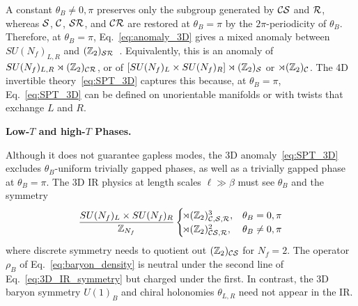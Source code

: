 \documentclass[
 reprint,







nofootinbib,


 amsmath,amssymb,
 aps,
 prd






tightenlines
]{revtex4-2}
\begin{document}
A constant $\theta_B\neq0,\pi$ preserves only the subgroup generated by
$\mathcal{C}\mathcal{S}$ and $\mathcal{R}$, whereas $\mathcal{S}$, $\mathcal{C}$, $\mathcal{S}\mathcal{R}$, and
$\mathcal{C}\mathcal{R}$ are restored at $\theta_B=\pi$ by the $2\pi$-periodicity
of $\theta_B$. Therefore, at $\theta_B=\pi$,
Eq.~\eqref{eq:anomaly_3D} gives a mixed anomaly between $SU(N_f)_{L,R}$
and $(\mathbb{Z}_2)_{\mathcal{S}\mathcal{R}}$~\cite{Yonekura:2019vyz,Nishimura:2019umw,Kobayashi:2023ajk}.
Equivalently, this is an anomaly of
$SU(N_f)_{L,R}\rtimes(\mathbb{Z}_2)_{\mathcal{C}\mathcal{R}}$, or of
$[SU(N_f)_L\times SU(N_f)_R]\rtimes(\mathbb{Z}_2)_{\mathcal{S}}$ or
$\rtimes(\mathbb{Z}_2)_{\mathcal{C}}$. The 4D invertible theory~\eqref{eq:SPT_3D} captures
this because, at $\theta_B=\pi$, Eq.~\eqref{eq:SPT_3D} can be defined on
unorientable manifolds or with twists that exchange $L$ and $R$.



{\bf Low-$T$ and high-$T$ Phases.}


Although it does not guarantee gapless modes, the 3D
anomaly~\eqref{eq:SPT_3D} excludes $\theta_B$-uniform trivially gapped
phases, as well as a trivially gapped phase at $\theta_B=\pi$.
The 3D IR physics at length scales $\ell\gg\beta$ must see $\theta_B$ and the symmetry
\begin{equation}\label{eq:3D_IR_symmetry}
    \frac{SU(N_f)_L\times SU(N_f)_R}{\mathbb{Z}_{N_f}}
    \begin{cases}
        \!\rtimes (\mathbb{Z}_2)^3_{\mathcal{C},\mathcal{S},\mathcal{R}}, & \theta_B=0,\pi \\
        \!\rtimes (\mathbb{Z}_2)^2_{\mathcal{C}\mathcal{S},\mathcal{R}}, & \theta_B\neq0,\pi
    \end{cases}
\end{equation}
where discrete symmetry needs to quotient out $(\mathbb{Z}_2)_{\mathcal{C}\mathcal{S}}$ for $N_f=2$.
The operator $\rho_B$ of Eq.~\eqref{eq:baryon_density} is neutral under
the second line of Eq.~\eqref{eq:3D_IR_symmetry} but charged under the
first.
In contrast, the 3D baryon symmetry $U(1)_B$ and chiral holonomies $\theta_{L,R}$ need not appear in the IR.
\end{document}

